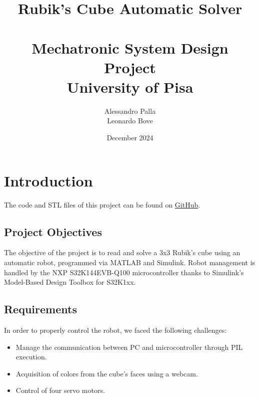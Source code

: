 \documentclass{report}
\title{%
    Rubik's Cube Automatic Solver \\
    \medskip \\
    \large Mechatronic System Design Project \\
    \large University of Pisa}
\author{Alessandro Palla \\
        Leonardo Bove}
\date{December 2024}
\begin{document}
\maketitle
\newpage
\tableofcontents

\chapter{Introduction}
The code and STL files of this project can be found on \href{https://github.com/leonardobove/rubik_solver_robot/tree/main}{GitHub}.
\section{Project Objectives}

The objective of the project is to read and solve a 3x3 Rubik's cube using an automatic robot, programmed via MATLAB and Simulink.
\newline
Robot management is handled by the NXP S32K144EVB-Q100
microcontroller thanks to Simulink's Model-Based Design Toolbox for S32K1xx.


\section{Requirements}

In order to properly control the robot, we faced the following challenges:
\begin{itemize}
    \item Manage the communication between PC and microcontroller through PIL execution.
    \item Acquisition of colors from the cube's faces using a webcam.
    \item Control of four servo motors.
\end{itemize}
\end{document}
